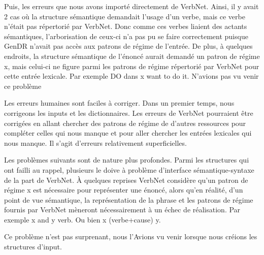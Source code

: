 Puis, les erreurs que nous avons importé directement de VerbNet. Ainsi, il y avait 2 cas où la structure sémantique demandait l'usage d'un verbe, mais ce verbe n'était pas répertorié par VerbNet. Donc comme ces verbes liaient des actants sémantiques, l'arborisation de ceux-ci n'a pas pu se faire correctement puisque GenDR n'avait pas accès aux patrons de régime de l'entrée. De plus, à quelques endroits, la structure sémantique de l'énoncé aurait demandé un patron de régime x, mais celui-ci ne figure parmi les patrons de régime répertorié par VerbNet pour cette entrée lexicale. Par exemple DO dans x want to do it. N'avions pas vu venir ce problème

Les erreurs humaines sont faciles à corriger. Dans un premier temps, nous corrigeons les inputs et les dictionnaires. Les erreurs de VerbNet pourraient être corrigées en allant chercher des patrons de régime de d'autres ressources pour compléter celles qui nous manque et pour aller chercher les entrées lexicales qui nous manque. Il s'agit d'erreurs relativement superficielles.

Les problèmes suivants sont de nature plus profondes. Parmi les structures qui ont failli au rappel, plusieurs le doive à problème d'interface sémantique-syntaxe de la part de VerbNet. À quelques reprises VerbNet considère qu'un patron de régime x est nécessaire pour représenter une énoncé, alors qu'en réalité, d'un point de vue sémantique, la représentation de la phrase et les patrons de régime fournis par VerbNet mèneront nécessairement à un échec de réalisation. Par exemple x and y verb. Ou bien x (verbe+cause) y.

 Ce problème n'est pas surprenant, nous l'Avions vu venir lorsque nous créions les structures d'input.

